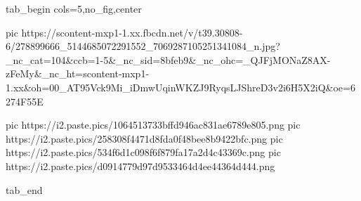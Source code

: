  
 
 
 
 

\ifcmt
  tab_begin cols=5,no_fig,center

     pic https://scontent-mxp1-1.xx.fbcdn.net/v/t39.30808-6/278899666_5144685072291552_7069287105251341084_n.jpg?_nc_cat=104&ccb=1-5&_nc_sid=8bfeb9&_nc_ohc=_QJFjMONaZ8AX-zFeMy&_nc_ht=scontent-mxp1-1.xx&oh=00_AT95Vck9Mi_iDmwUqinWKZJ9RyqsLJShreD3v2i6H5X2iQ&oe=6274F55E
		 
		 pic https://i2.paste.pics/1064513733bffd946ac831ae6789e805.png
		 pic https://i2.paste.pics/258308f4471d8fda0f48bee8b9422bfc.png
		 pic https://i2.paste.pics/534f6d1c098f6f879fa17a2d4c43369c.png
		 pic https://i2.paste.pics/d0914779d97d9533464d4ee44364d444.png

  tab_end
\fi
